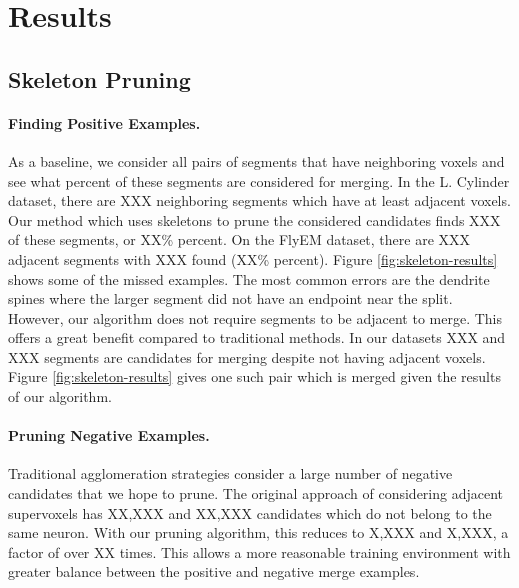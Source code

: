 \section{Results}

\subsection{Skeleton Pruning}

\paragraph{Finding Positive Examples.}

As a baseline, we consider all pairs of segments that have neighboring voxels and see what percent of these segments are considered for merging. In the L. Cylinder dataset, there are XXX neighboring segments which have at least adjacent voxels. Our method which uses skeletons to prune the considered candidates finds XXX of these segments, or XX\% percent. On the FlyEM dataset, there are XXX adjacent segments with XXX found (XX\% percent). Figure \ref{fig:skeleton-results} shows some of the missed examples. The most common errors are the dendrite spines where the larger segment did not have an endpoint near the split. However, our algorithm does not require segments to be adjacent to merge. This offers a great benefit compared to traditional methods. In our datasets XXX and XXX segments are candidates for merging despite not having adjacent voxels. Figure \ref{fig:skeleton-results} gives one such pair which is merged given the results of our algorithm. 

\paragraph{Pruning Negative Examples.}

Traditional agglomeration strategies consider a large number of negative candidates that we hope to prune. The original approach of considering adjacent supervoxels has XX,XXX and XX,XXX candidates which do not belong to the same neuron. With our pruning algorithm, this reduces to X,XXX and X,XXX, a factor of over XX times. This allows a more reasonable training environment with greater balance between the positive and negative merge examples. 

